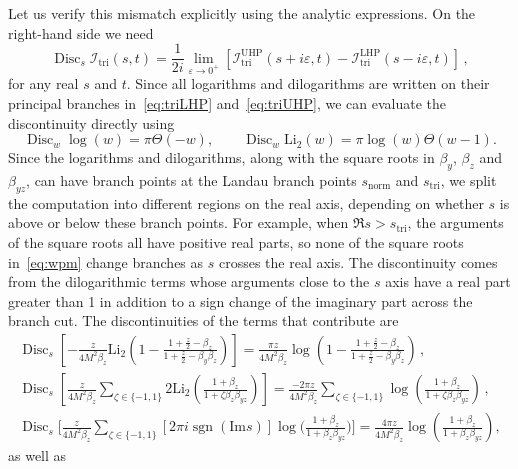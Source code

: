 \documentclass[12pt]{article}
\numberwithin{figure}{section}
\DeclareMathOperator{\sgn}{sgn}
\DeclareMathOperator{\Disc}{Disc}
\def \be {\begin{equation}}
\def \ee {\end{equation}}
\def \Im {\mathrm{Im}}
\def \triangle {\mathrm{tri}}
\def \normal {\mathrm{norm}}
\def \Li {\mathrm{Li}}
\def \UHP {\mathrm{UHP}}
\def \LHP {\mathrm{LHP}}
\begin{document}
    Let us verify this mismatch explicitly using the analytic expressions. On the right-hand side we need 
    \begin{equation}
        \Disc_s \mathcal{I}_\triangle (s,t) = \frac{1}{2 i} \lim_{\varepsilon \to 0^+} \left[ \mathcal{I}_\triangle^{\UHP}(s+i \varepsilon,t) - \mathcal{I}_\triangle^{\LHP}(s-i \varepsilon,t) \right] \,,
    \end{equation}
    for any real $s$ and $t$.
    Since all logarithms and dilogarithms are written on their principal branches in~\eqref{eq:triLHP} and~\eqref{eq:triUHP}, we can evaluate the discontinuity directly using
    \be
        \Disc_{w} \log(w) = \pi \Theta(-w), \qquad 
        \Disc_{w} \Li_2(w) = \pi \log(w) \Theta(w-1).
    \ee
    Since the logarithms and dilogarithms, along with the square roots in $\beta_y$, $\beta_z$ and $\beta_{yz}$, can have branch points at the Landau branch points $s_{\normal}$ and $s_{\triangle}$, we split the computation into different regions on the real axis, depending on whether $s$ is above or below these branch points. For example, when $\Re s>s_{\triangle}$, the arguments of the square roots all have positive real parts, so none of the square roots in~\eqref{eq:wpm} change branches as $s$ crosses the real axis. The discontinuity comes from the dilogarithmic terms whose arguments close to the $s$ axis have a real part greater than 1 in addition to a sign change of the imaginary part across the branch cut. The discontinuities of the terms that contribute are 
    \begin{gather}
    \Disc_s \left[ -\frac{z}{4 M^2 \beta_z} \Li_2 \left(1- \tfrac{1+\frac{z}{2} - \beta_z}{1+ \frac{z}{2} - \beta_y \beta_z } \right) \right]
     =
    \frac{\pi z}{4 M^2 \beta_z} \log\left(1- \tfrac{1+\frac{z}{2} - \beta_z}{1+ \frac{z}{2} - \beta_y \beta_z } \right) \,, \\
    \Disc_s \left[\frac{z}{4 M^2 \beta_z} \sum_{\zeta \in \{-1,1\}} 2 \Li_2 \left(\tfrac{1+\beta_z}{1+\zeta \beta_z \beta_{yz}} \right) \right]
     =
    \frac{-2 \pi z}{4 M^2 \beta_z} \sum_{\zeta \in \{-1,1\}} \log\left(\tfrac{1+\beta_z}{1+\zeta \beta_z \beta_{yz}} \right) \,, \\
    \Disc_s \Bigg[\frac{z}{4 M^2 \beta_z} \sum_{\zeta \in \{-1,1\}} [
    2 \pi i \sgn(\Im s)
    ]  \log \Big( \tfrac{1+\beta_z}{1+\beta_z \beta_{yz}} \Big) \Bigg]
    = \frac{4 \pi z}{4 M^2 \beta_z} \log\left(\tfrac{1+\beta_z}{1+ \beta_z \beta_{yz}} \right) ,
    \end{gather}
    as well as
\end{document}

